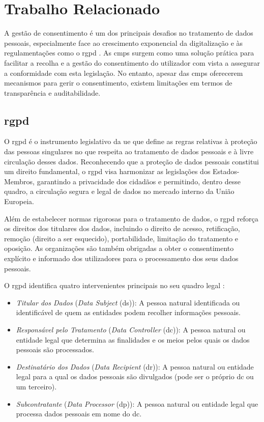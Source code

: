 \chapter{Trabalho Relacionado}
\label{cap:relacionado}

A gestão de consentimento é um dos principais desafios no tratamento de dados pessoais, especialmente face ao crescimento exponencial da digitalização e às regulamentações como o \acrshort{rgpd} \citep{gdpr}.
As \acrshort{cmp}s surgem como uma solução prática para facilitar a recolha e a gestão do consentimento do utilizador com vista a assegurar a conformidade com esta legislação. No entanto, apesar das \acrshort{cmp}s oferecerem mecanismos para gerir o consentimento, existem limitações em termos de transparência e auditabilidade.

\section{\acrfull{rgpd}}

O \acrshort{rgpd} é o instrumento legislativo da \acrfull{ue} que define as regras relativas à proteção das pessoas singulares no que respeita ao tratamento de dados pessoais e à livre circulação desses dados. Reconhecendo que a proteção de dados pessoais constitui um direito fundamental, o \acrshort{rgpd} visa harmonizar as legislações dos Estados-Membros, garantindo a privacidade dos cidadãos e permitindo, dentro desse quadro, a circulação segura e legal de dados no mercado interno da União Europeia.

Além de estabelecer normas rigorosas para o tratamento de dados, o \acrshort{rgpd} reforça os direitos dos titulares dos dados, incluindo o direito de acesso, retificação, remoção (direito a ser esquecido), portabilidade, limitação do tratamento e oposição. As organizações são também obrigadas a obter o consentimento explícito e informado dos utilizadores para o processamento dos seus dados pessoais. \citep{Daudén-Esmel2024}

O \acrshort{rgpd} identifica quatro intervenientes principais no seu quadro legal \citep{gdpr2016}:  
\begin{itemize}
    \item \textit{Titular dos Dados} (\textit{Data Subject} (\acrshort{ds})): A pessoa natural identificada ou identificável de quem as entidades podem recolher informações pessoais.  
    \item \textit{Responsável pelo Tratamento} (\textit{Data Controller} (\acrshort{dc})): A pessoa natural ou entidade legal que determina as finalidades e os meios pelos quais os dados pessoais são processados.  
    \item \textit{Destinatário dos Dados} (\textit{Data Recipient} (\acrshort{dr})): A pessoa natural ou entidade legal para a qual os dados pessoais são divulgados (pode ser o próprio \acrshort{dc} ou um terceiro).  
    \item \textit{Subcontratante} (\textit{Data Processor} (\acrshort{dp})): A pessoa natural ou entidade legal que processa dados pessoais em nome do \acrshort{dc}.
\end{itemize}

